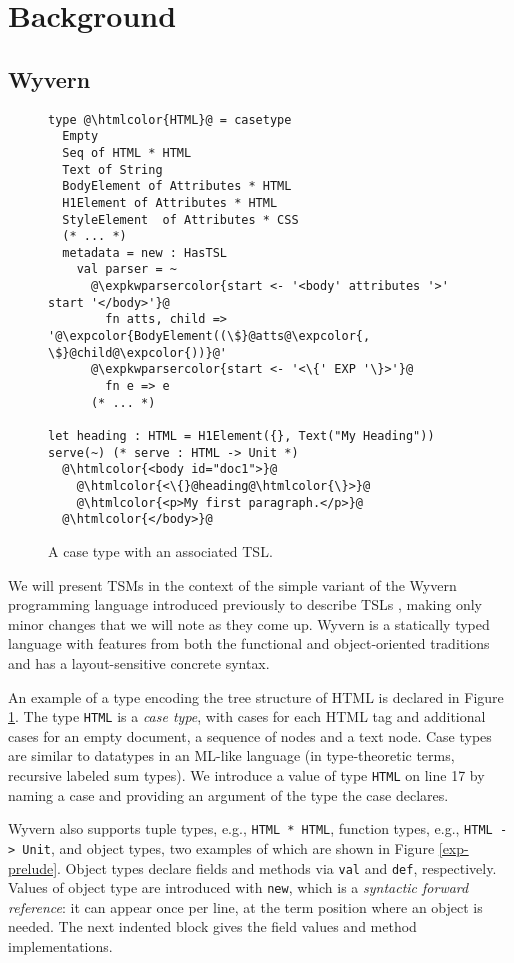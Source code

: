 \documentclass{sig-alternate}[10pt]
\newcommand{\htmlcolor}[1]{\textcolor[HTML]{339933}{#1}}
\newcommand{\expkwparsercolor}[1]{\textcolor[HTML]{336699}{#1}}
\newcommand{\expcolor}[1]{\textcolor[HTML]{FF0033}{#1}}
\newcommand{\mycaption}[1]{\vspace{-4px}\caption{#1}\vspace{-2px}}
\begin{document}
\section{Background}\label{background}
\subsection{Wyvern}

\begin{figure}[t!]
\begin{lstlisting}[style=wyvern]
type @\htmlcolor{HTML}@ = casetype 
  Empty
  Seq of HTML * HTML 
  Text of String
  BodyElement of Attributes * HTML
  H1Element of Attributes * HTML
  StyleElement  of Attributes * CSS
  (* ... *)
  metadata = new : HasTSL
    val parser = ~
      @\expkwparsercolor{start <- '<body' attributes '>' start '</body>'}@
        fn atts, child => '@\expcolor{BodyElement((\$}@atts@\expcolor{, \$}@child@\expcolor{))}@'
      @\expkwparsercolor{start <- '<\{' EXP '\}>'}@
        fn e => e
      (* ... *)

let heading : HTML = H1Element({}, Text("My Heading"))
serve(~) (* serve : HTML -> Unit *)
  @\htmlcolor{<body id="doc1">}@
    @\htmlcolor{<\{}@heading@\htmlcolor{\}>}@
    @\htmlcolor{<p>My first paragraph.</p>}@
  @\htmlcolor{</body>}@
\end{lstlisting}
\mycaption{A case type with an associated TSL.}
\label{f-htmltype}
\end{figure}
We will present TSMs in the context of the simple variant of the Wyvern programming language introduced previously to describe TSLs  \cite{TSLs}, making only minor changes that we will note as they come up. Wyvern is a statically typed  language with features from both the functional and object-oriented traditions and has a layout-sensitive concrete syntax. 

An example of a type encoding the tree structure of HTML is declared in Figure \ref{f-htmltype}. The type \verb|HTML| is a \emph{case type}, with cases for each HTML tag and additional cases for an empty document, a sequence of nodes and a text node. Case types are similar to datatypes in an ML-like language (in type-theoretic terms, recursive labeled sum types). 
We introduce a value of type \verb|HTML| on line 17 by naming a case and providing an argument of the type the case declares.

Wyvern also supports tuple types, e.g., \verb|HTML * HTML|, function types, e.g., \verb|HTML -> Unit|, and object types, two examples of which are shown in Figure \ref{exp-prelude}. Object types declare fields and methods via \texttt{val} and \texttt{def}, respectively. Values of object type are introduced with \verb|new|, which  is a  \emph{syntactic forward reference}: it can appear once per line, at the term position where an object is needed. The next indented block gives the field values and method implementations. %
\end{document}
